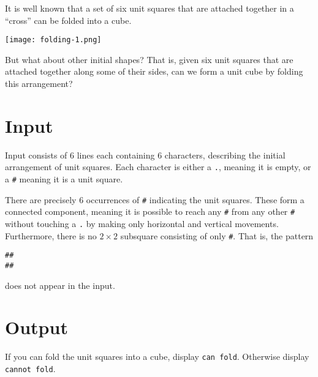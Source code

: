 
It is well known that a set of six unit squares
that are attached together in a ``cross'' can be folded into a cube.

\begin{center}
\texttt{[image: folding-1.png]}
\end{center}

But what about other initial shapes? That is, given six
unit squares that are attached together along some of their sides,
can we form a unit cube by folding this arrangement?

\section*{Input}

Input consists of $6$ lines each containing $6$ characters, describing
the initial arrangement of unit squares. Each character is either a \verb|.|,
meaning it is empty, or a \verb|#| meaning it is a unit square.

There are precisely $6$ occurrences of \verb|#| indicating
the unit squares. These form a connected component, meaning
it is possible to reach any \verb|#| from any other \verb|#| without
touching a \verb|.| by making only horizontal and vertical movements.
Furthermore, there is no $2 \times 2$ subsquare consisting
of only \verb|#|. That is, the pattern
\begin{verbatim}
##
##
\end{verbatim}
does not appear in the input.

\section*{Output}

If you can fold the unit squares into a cube, display \verb|can fold|.
Otherwise display \verb|cannot fold|.
